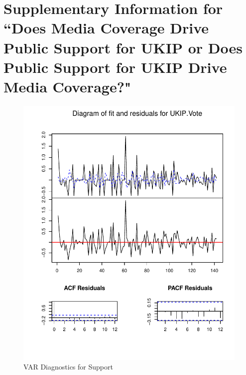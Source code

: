 \documentclass[11pt, oneside]{article}   	%
\title{}
\author{}
\date{}							%
\begin{document}
\section*{Supplementary Information for ``Does Media Coverage Drive Public Support for UKIP or Does Public Support
for UKIP Drive Media Coverage?"}

\begin{figure}[htbp]
\centering
\includegraphics[scale=.9]{ukip_media_files/var-plot-support.pdf}
\caption{VAR Diagnostics for Support}
\end{figure}
\end{document}
